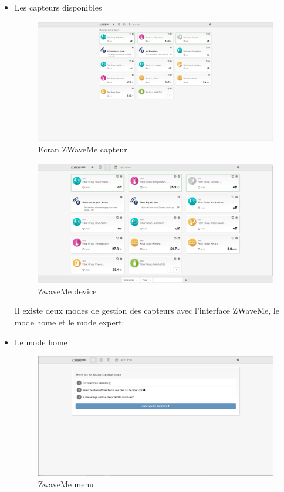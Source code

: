 \begin{itemize}
\item Les capteurs disponibles

\begin{figure}[h]
	\center
	\includegraphics[scale=0.5]{./Images/png/ecranCapteur.png}
	\caption{Ecran ZWaveMe capteur}
\end{figure}



\begin{figure}[h]
	\center
\includegraphics[scale=0.5]{./Images/png/device_zwaveme.png}
	\caption{ZwaveMe device}
\end{figure}


Il existe deux modes de gestion des capteurs avec l'interface ZWaveMe, le mode home et le mode expert:


\item Le mode home

\begin{figure}[h]
	\center
\includegraphics[scale=0.5]{./Images/png/home_zwaveme.png}
	\caption{ZwaveMe menu}
\end{figure}


\end{itemize}

